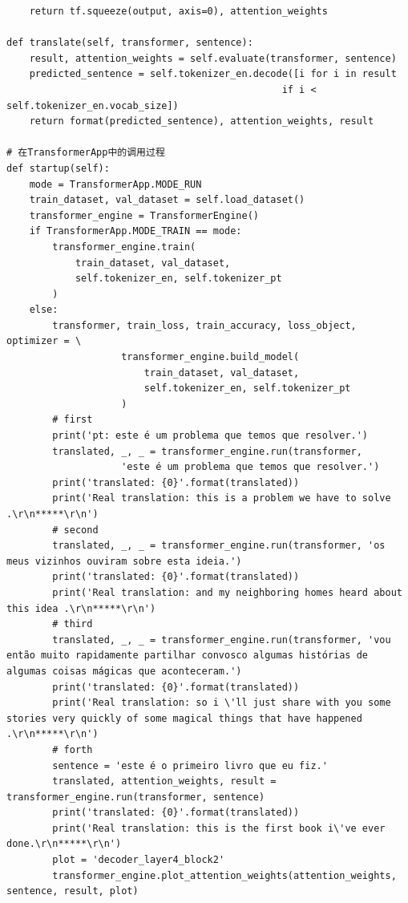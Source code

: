\documentclass{article}
\begin{document}
\begin{lstlisting}
    return tf.squeeze(output, axis=0), attention_weights

def translate(self, transformer, sentence):
    result, attention_weights = self.evaluate(transformer, sentence)
    predicted_sentence = self.tokenizer_en.decode([i for i in result 
                                                if i < self.tokenizer_en.vocab_size])
    return format(predicted_sentence), attention_weights, result

# 在TransformerApp中的调用过程
def startup(self):
    mode = TransformerApp.MODE_RUN
    train_dataset, val_dataset = self.load_dataset()
    transformer_engine = TransformerEngine()
    if TransformerApp.MODE_TRAIN == mode:
        transformer_engine.train(
            train_dataset, val_dataset,
            self.tokenizer_en, self.tokenizer_pt
        )
    else:
        transformer, train_loss, train_accuracy, loss_object, optimizer = \
                    transformer_engine.build_model(
                        train_dataset, val_dataset, 
                        self.tokenizer_en, self.tokenizer_pt
                    )
        # first
        print('pt: este é um problema que temos que resolver.')
        translated, _, _ = transformer_engine.run(transformer, 
                    'este é um problema que temos que resolver.')
        print('translated: {0}'.format(translated))
        print('Real translation: this is a problem we have to solve .\r\n*****\r\n')
        # second
        translated, _, _ = transformer_engine.run(transformer, 'os meus vizinhos ouviram sobre esta ideia.')
        print('translated: {0}'.format(translated))
        print('Real translation: and my neighboring homes heard about this idea .\r\n*****\r\n')
        # third
        translated, _, _ = transformer_engine.run(transformer, 'vou então muito rapidamente partilhar convosco algumas histórias de algumas coisas mágicas que aconteceram.')
        print('translated: {0}'.format(translated))
        print('Real translation: so i \'ll just share with you some stories very quickly of some magical things that have happened .\r\n*****\r\n')
        # forth
        sentence = 'este é o primeiro livro que eu fiz.'
        translated, attention_weights, result = transformer_engine.run(transformer, sentence)
        print('translated: {0}'.format(translated))
        print('Real translation: this is the first book i\'ve ever done.\r\n*****\r\n')
        plot = 'decoder_layer4_block2'
        transformer_engine.plot_attention_weights(attention_weights, sentence, result, plot)
\end{lstlisting}
\end{document}

